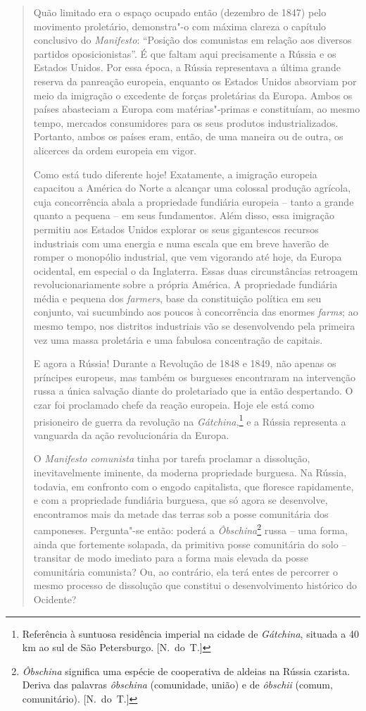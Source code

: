\begin{quote}
Quão limitado era o espaço ocupado então (dezembro de 1847) pelo
movimento proletário, demonstra"-o com máxima clareza o capítulo
conclusivo do \textit{Manifesto}: “Posição dos comunistas em relação
aos diversos partidos oposicionistas”. É que faltam aqui precisamente a
Rússia e os Estados Unidos. Por essa época, a Rússia
representava a última grande reserva da panreação europeia, enquanto
os Estados Unidos absorviam por meio da imigração o excedente de forças
proletárias da Europa. Ambos os países abasteciam a Europa com
matérias"-primas e constituíam, ao mesmo tempo, mercados consumidores
para os seus produtos industrializados. Portanto, ambos os países eram,
então, de uma maneira ou de outra, os alicerces da ordem europeia em
vigor.

Como está tudo diferente hoje! Exatamente, a imigração europeia capacitou
a América do Norte a alcançar uma colossal produção agrícola, cuja
concorrência abala a propriedade fundiária europeia – tanto a grande
quanto a pequena – em seus fundamentos. Além disso, essa imigração
permitiu aos Estados Unidos explorar os seus gigantescos recursos
industriais com uma energia e numa escala que em breve haverão de
romper o monopólio industrial, que vem vigorando até hoje, da Europa
ocidental, em especial o da Inglaterra. Essas duas circunstâncias
retroagem revolucionariamente sobre a própria América. A propriedade
fundiária média e pequena dos \textit{farmers}, base da constituição
política em seu conjunto, vai sucumbindo aos poucos à concorrência das
enormes \textit{farms}; ao mesmo tempo, nos distritos industriais vão
se desenvolvendo pela primeira vez uma massa proletária e uma fabulosa
concentração de capitais. 

E agora a Rússia! Durante a Revolução de 1848 e 1849, não apenas os
príncipes europeus, mas também os burgueses encontraram na intervenção
russa a única salvação diante do proletariado que ia então despertando.
O czar foi proclamado chefe da reação europeia. Hoje ele está como
prisioneiro de guerra da revolução na \textit{Gátchina,}\footnote{
Referência à suntuosa residência imperial na cidade de
\textit{Gátchina}, situada a 40 km ao sul de São Petersburgo. [N.~do~T.]}   e a Rússia representa a vanguarda da ação revolucionária da
Europa.

 O \textit{Manifesto comunista} tinha por tarefa proclamar a dissolução,
inevitavelmente iminente, da moderna propriedade burguesa. Na Rússia,
todavia, em confronto com o engodo capitalista, que floresce rapidamente,
e com a propriedade fundiária burguesa, que só agora se desenvolve,
encontramos mais da metade das terras sob a posse comunitária dos
camponeses. Pergunta"-se então: poderá a
\textit{Ôbschina}\footnote{ \textit{Ôbschina} significa uma
espécie de cooperativa de aldeias na Rússia czarista. Deriva das
palavras \textit{ôbschina} (comunidade, união) e de \textit{ôbschii} (comum, comunitário). [N.~do~T.]} russa
– uma forma, ainda que fortemente solapada, da primitiva posse
comunitária do solo – transitar de modo imediato para a forma mais
elevada da posse comunitária comunista? Ou, ao contrário, ela terá
entes de percorrer o mesmo processo de dissolução que constitui o
desenvolvimento histórico do Ocidente?


\end{quote}
